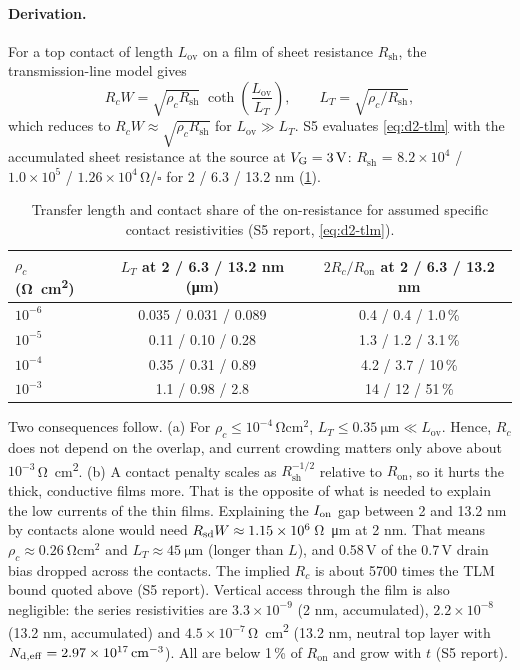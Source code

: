 \paragraph{Derivation.}
For a top contact of length $L_{\mathrm{ov}}$ on a film of sheet resistance $R_{\mathrm{sh}}$, the transmission-line model gives
\begin{equation}
  R_c W = \sqrt{\rho_c R_{\mathrm{sh}}}\;\coth\!\left(\frac{L_{\mathrm{ov}}}{L_T}\right),\qquad
  L_T=\sqrt{\rho_c/R_{\mathrm{sh}}},
  \label{eq:d2-tlm}
\end{equation}
which reduces to $R_cW\approx\sqrt{\rho_cR_{\mathrm{sh}}}$ for $L_{\mathrm{ov}}\gg L_T$. S5 evaluates \cref{eq:d2-tlm} with the accumulated sheet resistance at the source at $V_{\mathrm{G}}=\SI{3}{V}$: $R_{\mathrm{sh}}$ = $8.2\times10^{4}$ / $1.0\times10^{5}$ / $1.26\times10^{4}$\,\si{\ohm}/$\square$ for 2 / 6.3 / 13.2 nm (\cref{tab:d2-contacts}).
\begin{table}[htbp]
\centering
\small
\caption{Transfer length and contact share of the on-resistance for assumed specific contact resistivities (S5 report, \cref{eq:d2-tlm}).}
\label{tab:d2-contacts}
\begin{tabular}{@{}lcc@{}}
\toprule
$\rho_c$ (\si{\ohm\centi\metre\squared}) & $L_T$ at 2 / 6.3 / 13.2 nm (\si{\micro\metre}) & $2R_c/R_{\mathrm{on}}$ at 2 / 6.3 / 13.2 nm \\
\midrule
$10^{-6}$ & 0.035 / 0.031 / 0.089 & 0.4 / 0.4 / 1.0\,\% \\
$10^{-5}$ & 0.11 / 0.10 / 0.28   & 1.3 / 1.2 / 3.1\,\% \\
$10^{-4}$ & 0.35 / 0.31 / 0.89   & 4.2 / 3.7 / 10\,\% \\
$10^{-3}$ & 1.1 / 0.98 / 2.8     & 14 / 12 / 51\,\% \\
\bottomrule
\end{tabular}
\end{table}
Two consequences follow. (a) For $\rho_c\le10^{-4}\,\si{\ohm\centi\metre\squared}$, $L_T\le\SI{0.35}{\micro\metre}\ll L_{\mathrm{ov}}$. Hence, $R_c$ does not depend on the overlap, and current crowding matters only above about $10^{-3}$\,\si{\ohm\centi\metre\squared}. (b) A contact penalty scales as $R_{\mathrm{sh}}^{-1/2}$ relative to $R_{\mathrm{on}}$, so it hurts the thick, conductive films more. That is the opposite of what is needed to explain the low currents of the thin films. Explaining the $I_{\mathrm{on}}$ gap between 2 and 13.2 nm by contacts alone would need $R_{\mathrm{sd}} W\approx1.15\times10^{6}$\,\si{\ohm\micro\metre} at 2 nm. That means $\rho_c\approx\SI{0.26}{\ohm\centi\metre\squared}$ and $L_T\approx\SI{45}{\micro\metre}$ (longer than $L$), and 0.58\,V of the 0.7\,V drain bias dropped across the contacts. The implied $R_c$ is about 5700 times the TLM bound quoted above (S5 report). Vertical access through the film is also negligible: the series resistivities are $3.3\times10^{-9}$ (2 nm, accumulated), $2.2\times10^{-8}$ (13.2 nm, accumulated) and $4.5\times10^{-7}$\,\si{\ohm\centi\metre\squared} (13.2 nm, neutral top layer with $N_{\mathrm{d,eff}}=2.97\times10^{17}\,\mathrm{cm}^{-3}$). All are below 1\,\% of $R_{\mathrm{on}}$ and grow with $t$ (S5 report).

